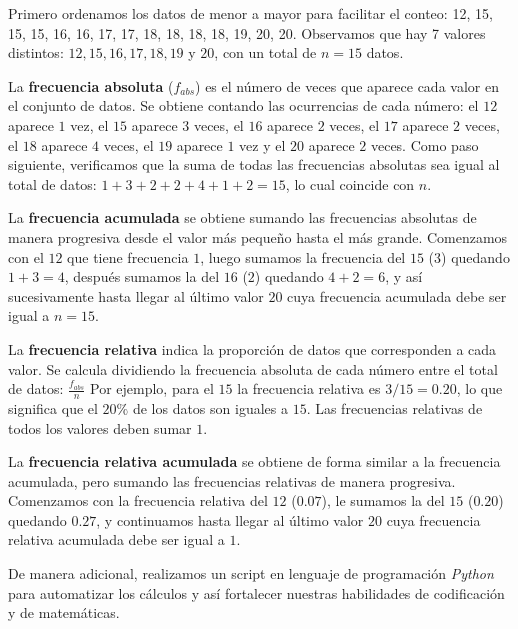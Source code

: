 \documentclass[12pt]{article}
\begin{document}
Primero ordenamos los datos de menor a mayor para facilitar el conteo: 12, 15, 15, 15, 16, 16, 17, 17, 18, 18, 18, 18, 19, 20, 20. Observamos que hay 7 valores distintos: $12, 15, 16, 17, 18, 19$ y $20$, con un total de $n = 15$ datos.

La \textbf{frecuencia absoluta} ($f_{abs}$) es el número de veces que aparece cada valor en el conjunto de datos. Se obtiene contando las ocurrencias de cada número: el $12$ aparece $1$ vez, el $15$ aparece $3$ veces, el $16$ aparece $2$ veces, el $17$ aparece $2$ veces, el $18$ aparece $4$ veces, el $19$ aparece $1$ vez y el $20$ aparece $2$ veces. Como paso siguiente, verificamos que la suma de todas las frecuencias absolutas sea igual al total de datos: $1 + 3 + 2 + 2 + 4 + 1 + 2 = 15$, lo cual coincide con $n$.

La \textbf{frecuencia acumulada} se obtiene sumando las frecuencias absolutas de manera progresiva desde el valor más pequeño hasta el más grande. Comenzamos con el $12$ que tiene frecuencia $1$, luego sumamos la frecuencia del $15$ ($3$) quedando $1 + 3 = 4$, después sumamos la del $16$ ($2$) quedando $4 + 2 = 6$, y así sucesivamente hasta llegar al último valor $20$ cuya frecuencia acumulada debe ser igual a $n = 15$.

La \textbf{frecuencia relativa} indica la proporción de datos que corresponden a cada valor. Se calcula dividiendo la frecuencia absoluta de cada número entre el total de datos: $\frac{f_{abs}}{n}$
Por ejemplo, para el $15$ la frecuencia relativa es $3/15 = 0.20$, lo que significa que el $20\%$ de los datos son iguales a $15$. Las frecuencias relativas de todos los valores deben sumar $1$.

La \textbf{frecuencia relativa acumulada} se obtiene de forma similar a la frecuencia acumulada, pero sumando las frecuencias relativas de manera progresiva. Comenzamos con la frecuencia relativa del $12$ ($0.07$), le sumamos la del $15$ ($0.20$) quedando $0.27$, y continuamos hasta llegar al último valor $20$ cuya frecuencia relativa acumulada debe ser igual a $1$.

De manera adicional, realizamos un script en lenguaje de programación \textit{Python} para automatizar los cálculos y así fortalecer nuestras habilidades de codificación y de matemáticas.

\end{document}
